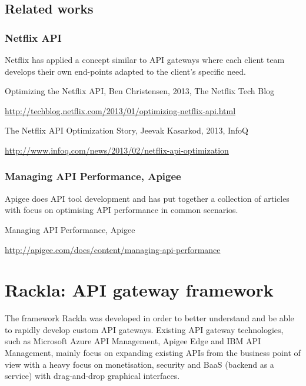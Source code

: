 \documentclass{cslthse-msc}
\begin{document}
\section{Related works}

\subsection{Netflix API}
Netflix has applied a concept similar to API gateways where each client team develops their own end-points adapted to the client's specific need.

\vspace{5mm}

\noindent Optimizing the Netflix API, Ben Christensen, 2013, The Netflix Tech Blog

\noindent \url{http://techblog.netflix.com/2013/01/optimizing-netflix-api.html}

\vspace{5mm}

\noindent The Netflix API Optimization Story, Jeevak Kasarkod, 2013, InfoQ

\noindent \url{http://www.infoq.com/news/2013/02/netflix-api-optimization}


\subsection{Managing API Performance, Apigee}
Apigee does API tool development and has put together a collection of articles with focus on optimising API performance in common scenarios.

\vspace{5mm}

\noindent Managing API Performance, Apigee

\noindent \url{http://apigee.com/docs/content/managing-api-performance}

\chapter{Rackla: API gateway framework}

The framework Rackla was developed in order to better understand and be able to rapidly develop custom API gateways. Existing API gateway technologies, such as Microsoft Azure API Management\cite{azure_api_management}, Apigee Edge\cite{apigee_edge} and IBM API Management\cite{ibm_api_management}, mainly focus on expanding existing APIs from the business point of view with a heavy focus on monetisation, security and BaaS (backend as a service) with drag-and-drop graphical interfaces. 
\end{document}
